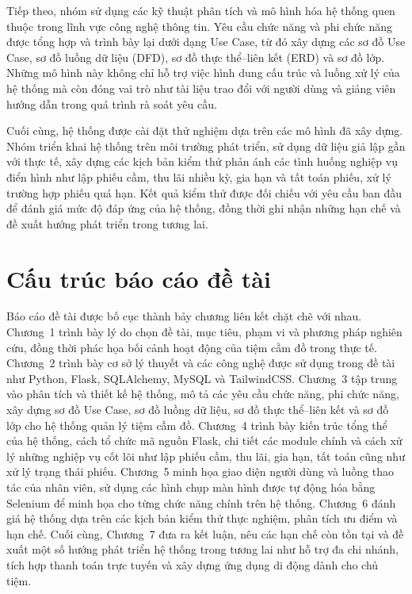 \documentclass[13pt,a4paper]{extreport}
\begin{document}
Tiếp theo, nhóm sử dụng các kỹ thuật phân tích và mô hình hóa hệ thống quen thuộc trong lĩnh vực công nghệ thông tin. Yêu cầu chức năng và phi chức năng được tổng hợp và trình bày lại dưới dạng Use Case, từ đó xây dựng các sơ đồ Use Case, sơ đồ luồng dữ liệu (DFD), sơ đồ thực thể--liên kết (ERD) và sơ đồ lớp. Những mô hình này không chỉ hỗ trợ việc hình dung cấu trúc và luồng xử lý của hệ thống mà còn đóng vai trò như tài liệu trao đổi với người dùng và giảng viên hướng dẫn trong quá trình rà soát yêu cầu.

Cuối cùng, hệ thống được cài đặt thử nghiệm dựa trên các mô hình đã xây dựng. Nhóm triển khai hệ thống trên môi trường phát triển, sử dụng dữ liệu giả lập gần với thực tế, xây dựng các kịch bản kiểm thử phản ánh các tình huống nghiệp vụ điển hình như lập phiếu cầm, thu lãi nhiều kỳ, gia hạn và tất toán phiếu, xử lý trường hợp phiếu quá hạn. Kết quả kiểm thử được đối chiếu với yêu cầu ban đầu để đánh giá mức độ đáp ứng của hệ thống, đồng thời ghi nhận những hạn chế và đề xuất hướng phát triển trong tương lai.

\section{Cấu trúc báo cáo đề tài}

Báo cáo đề tài được bố cục thành bảy chương liên kết chặt chẽ với nhau. Chương~1 trình bày lý do chọn đề tài, mục tiêu, phạm vi và phương pháp nghiên cứu, đồng thời phác họa bối cảnh hoạt động của tiệm cầm đồ trong thực tế. Chương~2 trình bày cơ sở lý thuyết và các công nghệ được sử dụng trong đề tài như Python, Flask, SQLAlchemy, MySQL và TailwindCSS. Chương~3 tập trung vào phân tích và thiết kế hệ thống, mô tả các yêu cầu chức năng, phi chức năng, xây dựng sơ đồ Use Case, sơ đồ luồng dữ liệu, sơ đồ thực thể--liên kết và sơ đồ lớp cho hệ thống quản lý tiệm cầm đồ. Chương~4 trình bày kiến trúc tổng thể của hệ thống, cách tổ chức mã nguồn Flask, chi tiết các module chính và cách xử lý những nghiệp vụ cốt lõi như lập phiếu cầm, thu lãi, gia hạn, tất toán cũng như xử lý trạng thái phiếu. Chương~5 minh họa giao diện người dùng và luồng thao tác của nhân viên, sử dụng các hình chụp màn hình được tự động hóa bằng Selenium để minh họa cho từng chức năng chính trên hệ thống. Chương~6 đánh giá hệ thống dựa trên các kịch bản kiểm thử thực nghiệm, phân tích ưu điểm và hạn chế. Cuối cùng, Chương~7 đưa ra kết luận, nêu các hạn chế còn tồn tại và đề xuất một số hướng phát triển hệ thống trong tương lai như hỗ trợ đa chi nhánh, tích hợp thanh toán trực tuyến và xây dựng ứng dụng di động dành cho chủ tiệm.
\end{document}
